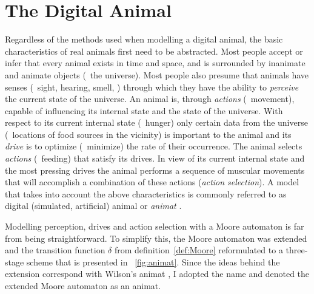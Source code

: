 \section{The Digital Animal}
\label{sec:animat}
Regardless of the methods used when modelling a digital animal, the basic characteristics of real animals first need to be abstracted. Most people accept or infer that every animal exists in time and space, and is surrounded by inanimate and animate objects (\ie\ the universe). Most people also presume that animals have senses (\ie\ sight, hearing, smell, \etc) through which they have the ability to \emph{perceive} the current state of the universe. An animal is, through \emph{actions} (\eg\ movement), capable of influencing its internal state and the state of the universe. With respect to its current internal state (\eg\ hunger) only certain data from the universe (\eg\ locations of food sources in the vicinity) is important to the animal and its \emph{drive} is to optimize (\eg\ minimize) the rate of their occurrence. The animal selects \emph{actions} (\eg\ feeding) that satisfy its drives. In view of its current internal state and the most pressing drives the animal performs a sequence of muscular movements that will accomplish a combination of these actions (\emph{action selection}). A model that takes into account the above characteristics is commonly referred to as digital (simulated, artificial) animal or \emph{animat} \cite{cliff:1993,watts:1998,wilson:1985}.

Modelling perception, drives and action selection with a Moore automaton is far from being straightforward. To simplify this, the Moore automaton was extended  \cite{lebar_bajec:2002,lebar_bajec:2003a,lebar_bajec:2003b} and the transition function $\delta$ from definition~\ref{def:Moore} reformulated to a three-stage scheme that is presented in \fig~\ref{fig:animat}. Since the ideas behind the extension correspond with Wilson's animat \cite{wilson:1985}, I adopted the name and denoted the extended Moore automaton as an animat. 
%
%
%
%
%
%
%

